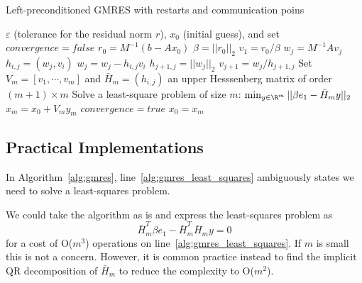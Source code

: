 \begin{algorithm}                      %
\caption{Left-preconditioned GMRES with restarts and {\color{red} communication poins} }          %
\label{alg:gmres_comm}                           %
\begin{algorithmic}[1]                   %
    \State $\varepsilon$ (tolerance for the residual norm $r$), $x_0$ (initial guess), and set $convergence = false$
    \State $r_0 = M^{-1} (b-Ax_0)$ 	
    \State $\beta = ||r_0||_2$		
    \State $v_1 = r_0 / \beta$
			\State $w_j = M^{-1} A v_j$			 	
				\State $h_{i,j} = (w_j, v_i)$ 				
				\State $w_j = w_j - h_{i,j} v_i$
			\EndFor 
			\State $h_{j+1, j}  = ||w_j||_2$			
			\State $v_{j+1} = w_j / h_{j+1,j}$	
	\EndFor
	\State Set $V_m = [v_1, \cdots, v_m]$ and $\bar{H}_m = (h_{i,j})$ an upper Hesssenberg matrix of order $(m+1)\times m$
	\State Solve a least-square problem of size $m$: $\min_{y \in \R^m} ||\beta e_1 - \bar{H}_m y||_2$
	\State $x_m = x_0 + V_m y_m$
		\State $convergence = true$
	\EndIf
	\State $x_0 = x_m$
    \EndWhile
\end{algorithmic}
\end{algorithm}

\subsection{Practical Implementations}

In Algorithm~\ref{alg:gmres}, line~\ref{alg:gmres_least_squares} ambiguously states we need to solve a least-squares problem. 


We could take the algorithm as is and express the least-squares problem as 
\begin{equation} 
\bar{H}_m^T \beta e_1 - \bar{H}_m^T \bar{H}_m y = 0 \label{eq:least_squares}
\end{equation}
for a cost of O($m^3$) operations on line~\ref{alg:gmres_least_squares}. If $m$ is small this is not a concern. However, it is common practice instead to find the implicit QR decomposition of $\bar{H}_m$ to reduce the complexity to O($m^2$). 

